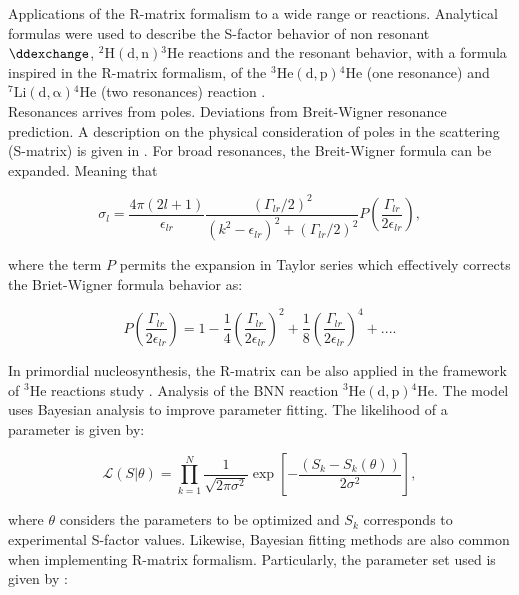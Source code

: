 \documentclass[openany]{book}
\begin{document}
Applications of the R-matrix formalism to a wide range or reactions. Analytical formulas were used to describe the S-factor behavior of non resonant $\ddexchange$, $\mathrm{{}^{2}H(d, n){}^{3}He}$ reactions and the resonant behavior, with a formula inspired in the R-matrix formalism, of the $\mathrm{{}^{3}He(d,p){}^{4}He}$ (one resonance) and $\mathrm{{}^{7}Li(d, \alpha){}^{4}He}$ (two resonances) reaction \cite{sparta_pizzone_bertulani_hou_lamia_tumino_2020}. \\

Resonances arrives from poles. Deviations from Breit-Wigner resonance prediction. A description on the physical consideration of poles in the scattering (S-matrix) is given in \cite{ramirezjimenez_kelkar_2018}. For broad resonances, the Breit-Wigner formula can be expanded. Meaning that 

\begin{equation}\label{eq:rmatrix_generalizedBW}
	\sigma_l = \frac{4\pi(2l+1)}{\epsilon_{lr}} \frac{(\Gamma_{lr}/2 )^2}{(k^2 - \epsilon_{lr})^2 + (\Gamma_{lr}/2)^2} P \left(\frac{\Gamma_{lr}}{2\epsilon_{lr}}\right),
\end{equation}

where the term $P$ permits the expansion in Taylor series which effectively corrects the Briet-Wigner formula behavior as: 

\begin{equation}\label{eq:rmatrix_generalizedBW_expansion}
	P \left(\frac{\Gamma_{lr}}{2\epsilon_{lr}}\right) = 1 - \frac{1}{4} \left(\frac{\Gamma_{lr}}{2\epsilon_{lr}}\right)^2 + \frac{1}{8} \left(\frac{\Gamma_{lr}}{2\epsilon_{lr}}\right) ^4 + ... .
\end{equation}


In primordial nucleosynthesis, the R-matrix can be also applied in the framework of $\mathrm{{}^{3}He}$ reactions study  \cite{desouza_iliadis_coc_2019}. Analysis of the BNN reaction $\mathrm{{}^{3}He(d, p){}^{4}He}$. The model uses Bayesian analysis to improve parameter fitting. The likelihood of a parameter is given by:

\begin{equation}\label{eq:rmatrix_bayesian_likelihood}
	\mathcal{L}(S|\theta) = \prod_{k=1}^{N} \frac{1}{\sqrt{2\pi \sigma^2} } \exp {\left[- \frac{(S_k - S_k(\theta))}{2\sigma^2}\right]},
\end{equation}

where $\theta$ considers the parameters to be optimized and $S_k$ corresponds to experimental S-factor values. Likewise, Bayesian fitting methods are also common when implementing R-matrix formalism. Particularly, the parameter set used is given by \cite{odell_brune_phillips_2022}:
\end{document}
